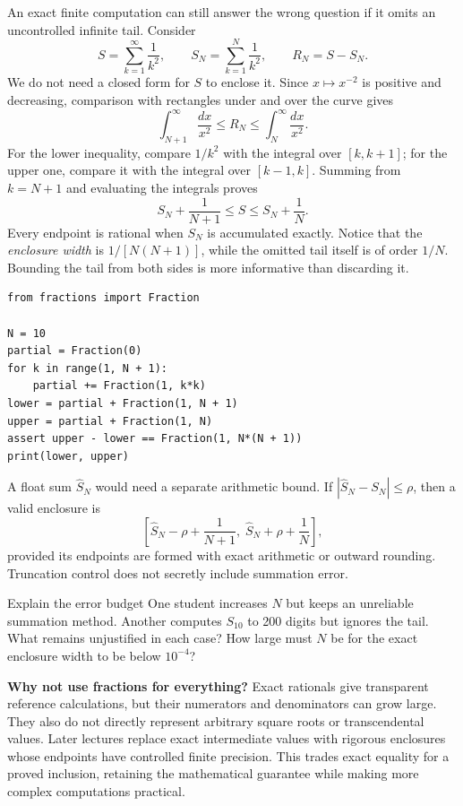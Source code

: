 \newpage
{}
An exact finite computation can still answer the wrong question if it omits an
uncontrolled infinite tail. Consider
\[
 S=\sum_{k=1}^{\infty}\frac1{k^2},\qquad
 S_N=\sum_{k=1}^{N}\frac1{k^2},\qquad R_N=S-S_N.
\]
We do not need a closed form for $S$ to enclose it. Since $x\mapsto x^{-2}$ is
positive and decreasing, comparison with rectangles under and over the curve gives
\[
 \int_{N+1}^{\infty}\frac{dx}{x^2}\le R_N\le
 \int_N^{\infty}\frac{dx}{x^2}.
\]
For the lower inequality, compare $1/k^2$ with the integral over $[k,k+1]$;
for the upper one, compare it with the integral over $[k-1,k]$. Summing from
$k=N+1$ and evaluating the integrals proves
\[
 \boxed{\quad S_N+\frac1{N+1}\le S\le S_N+\frac1N.\quad}
\]
Every endpoint is rational when $S_N$ is accumulated exactly. Notice that the
\emph{enclosure width} is $1/[N(N+1)]$, while the omitted tail itself is of order
$1/N$. Bounding the tail from both sides is more informative than discarding it.
\begin{lstlisting}
from fractions import Fraction

N = 10
partial = Fraction(0)
for k in range(1, N + 1):
    partial += Fraction(1, k*k)
lower = partial + Fraction(1, N + 1)
upper = partial + Fraction(1, N)
assert upper - lower == Fraction(1, N*(N + 1))
print(lower, upper)
\end{lstlisting}
A float sum $\widehat S_N$ would need a separate arithmetic bound. If
$|\widehat S_N-S_N|\le\rho$, then a valid enclosure is
\[
 \left[\widehat S_N-\rho+\frac1{N+1},\;
       \widehat S_N+\rho+\frac1N\right],
\]
provided its endpoints are formed with exact arithmetic or outward rounding.
Truncation control does not secretly include summation error.

\begin{question}{Explain the error budget}
One student increases $N$ but keeps an unreliable summation method. Another computes
$S_{10}$ to 200 digits but ignores the tail. What remains unjustified in each case?
How large must $N$ be for the exact enclosure width to be below $10^{-4}$?
\end{question}

\textbf{Why not use fractions for everything?} Exact rationals give transparent
reference calculations, but their numerators and denominators can grow large.
They also do not directly represent arbitrary square roots or transcendental
values. Later lectures replace exact intermediate values with rigorous enclosures
whose endpoints have controlled finite precision. This trades exact equality for
a proved inclusion, retaining the mathematical guarantee while making more complex
computations practical.

